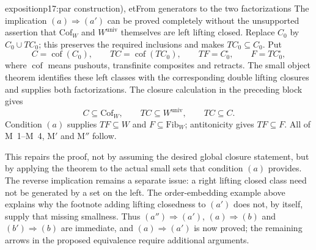 \begin{dcomment}{exposition}{p17:par construction), et}{From generators to the two factorizations}
The implication $(a)\Rightarrow(a')$ can be proved completely without the unsupported assertion that $\mathrm{Cof}_W$ and $W^{\mathrm{univ}}$ themselves are left lifting closed. Replace $C_0$ by $C_0\cup TC_0$; this preserves the required inclusions and makes $TC_0\subseteq C_0$. Put
\[
 C=\operatorname{cof}(C_0),\qquad
 TC=\operatorname{cof}(TC_0),\qquad
 TF=C_0^{\square},\qquad F=TC_0^{\square},
\]
where $\operatorname{cof}$ means pushouts, transfinite composites and retracts. The small object theorem identifies these left classes with the corresponding double lifting closures and supplies both factorizations. The closure calculation in the preceding block gives
\[
 C\subseteq\mathrm{Cof}_W,\qquad
 TC\subseteq W^{\mathrm{univ}},\qquad TC\subseteq C.
\]
Condition $(a)$ supplies $TF\subseteq W$ and $F\subseteq\mathrm{Fib}_W$; antitonicity gives $TF\subseteq F$. All of M~1--M~4, M$'$ and M$''$ follow.

This repairs the proof, not by assuming the desired global closure statement, but by applying the theorem to the actual small sets that condition $(a)$ provides. The reverse implication remains a separate issue: a right lifting closed class need not be generated by a set on the left. The order-embedding example above explains why the footnote adding lifting closedness to $(a')$ does not, by itself, supply that missing smallness. Thus $(a'')\Rightarrow(a')$, $(a)\Rightarrow(b)$ and $(b')\Rightarrow(b)$ are immediate, and $(a)\Rightarrow(a')$ is now proved; the remaining arrows in the proposed equivalence require additional arguments.
\end{dcomment}


